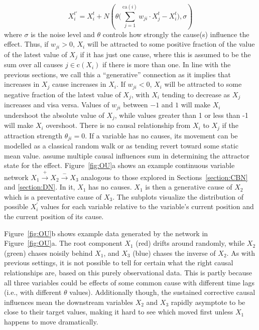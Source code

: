 \documentclass{cambridge7A}%
\begin{document}
\begin{equation} \label{cont_OU_def}
X_i^{t'} = X_i^{t} + N(\theta\big(\sum_{j=1}^{\mathrm{ca}(i)}w_{ji} \cdot X_j^t - X_i^t\big),\sigma)
\end{equation}
where $\sigma$ is the noise level and $\theta$ controls how strongly the cause(s) influence the effect.  
Thus, if $w_{ji}>0$, $X_i$ will be attracted to some positive fraction of the value of the latest value of $X_j$ if it has just one cause, where this is assumed to be the sum over all causes $j\in\mathrm{c}(X_i)$ if there is more than one.  In line with the previous sections, we call this a ``generative'' connection as it implies that increases in $X_j$ cause increases in $X_i$.  If $w_{ji}<0$, $X_i$ will be attracted to some negative fraction of the latest value of $X_j$, with $X_i$ tending to decrease as $X_j$ increases and visa versa.  Values of $w_{ji}$ between $-1$ and $1$ will make $X_i$ undershoot the absolute value of $X_j$, while values greater than 1 or less than -1 will make $X_i$ overshoot. There is no causal relationship from $X_i$ to $X_j$ if 
the attraction strength $\theta_{ji}=0$.  If a variable has no causes, its movement can be modelled as a classical random walk or as tending revert toward some static mean value.  
\cite{davis2018ctcv} assume multiple causal influences sum in determining the attractor state for the effect.  
Figure~\ref{fig:OU}a shows an example continuous variable network $X_1\!\stackrel{+}\rightarrow\!X_2\!\stackrel{-}\rightarrow\!X_3$ analogous to those explored in Sections~\ref{section:CBN} and \ref{section:DN}.  In it, $X_1$ has no causes.  $X_1$ is then a generative cause of $X_2$ 
which is a preventative cause of $X_3$. 
The subplots visualize the distribution of possible $X_i^{\prime}$ values for each variable relative to the variable's current position and the current position of its cause.

Figure~\ref{fig:OU}b shows example data generated by the network in Figure~\ref{fig:OU}a.  The root component $X_1$ (red) drifts around randomly, while $X_2$ (green) chases noisily behind $X_1$, and $X_3$ (blue) chases the inverse of $X_2$.  As with previous settings, it is not possible to tell for certain what the right causal relationships are, based on this purely observational data.  This is partly because all three variables could be effects of some common cause with different time lags (i.e., with different $\theta$ values). Additionally though, the sustained corrective causal influences mean the downstream variables $X_2$ and $X_3$ rapidly asymptote to be close to their target values, making it hard to see which moved first unless $X_1$ happens to move dramatically.  
\end{document}

